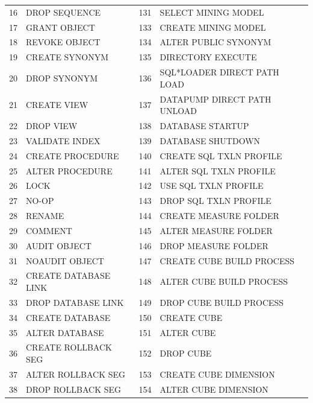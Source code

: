 \begin{appendix}
\begin{longtable}[]{@{}rl|rl@{}}
16   & DROP SEQUENCE                & 131 & SELECT MINING MODEL          \\
17   & GRANT OBJECT                 & 133 & CREATE MINING MODEL          \\
18   & REVOKE OBJECT                & 134 & ALTER PUBLIC SYNONYM         \\
19   & CREATE SYNONYM               & 135 & DIRECTORY EXECUTE            \\
20   & DROP SYNONYM                 & 136 & SQL*LOADER DIRECT PATH LOAD  \\
21   & CREATE VIEW                  & 137 & DATAPUMP DIRECT PATH UNLOAD  \\
22   & DROP VIEW                    & 138 & DATABASE STARTUP             \\
23   & VALIDATE INDEX               & 139 & DATABASE SHUTDOWN            \\
24   & CREATE PROCEDURE             & 140 & CREATE SQL TXLN PROFILE      \\
25   & ALTER PROCEDURE              & 141 & ALTER SQL TXLN PROFILE       \\
26   & LOCK                         & 142 & USE SQL TXLN PROFILE         \\
27   & NO-OP                        & 143 & DROP SQL TXLN PROFILE        \\
28   & RENAME                       & 144 & CREATE MEASURE FOLDER        \\
29   & COMMENT                      & 145 & ALTER MEASURE FOLDER         \\
30   & AUDIT OBJECT                 & 146 & DROP MEASURE FOLDER          \\
31   & NOAUDIT OBJECT               & 147 & CREATE CUBE BUILD PROCESS    \\
32   & CREATE DATABASE LINK         & 148 & ALTER CUBE BUILD PROCESS     \\
33   & DROP DATABASE LINK           & 149 & DROP CUBE BUILD PROCESS      \\
34   & CREATE DATABASE              & 150 & CREATE CUBE                  \\
35   & ALTER DATABASE               & 151 & ALTER CUBE                   \\
36   & CREATE ROLLBACK SEG          & 152 & DROP CUBE                    \\  
37   & ALTER ROLLBACK SEG           & 153 & CREATE CUBE DIMENSION        \\
38   & DROP ROLLBACK SEG            & 154 & ALTER CUBE DIMENSION         \\

\end{longtable}
\end{appendix}
